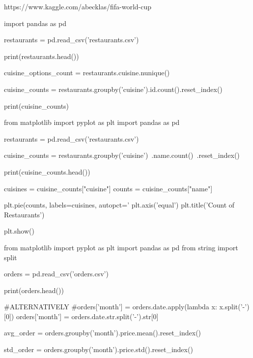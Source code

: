 \documentclass{journal}
\begin{document}
https://www.kaggle.com/abecklas/fifa-world-cup



import pandas as pd

restaurants = pd.read_csv('restaurants.csv')

print(restaurants.head())

cuisine_options_count = restaurants.cuisine.nunique()

cuisine_counts = restaurants.groupby('cuisine').id.count().reset_index()

print(cuisine_counts)












from matplotlib import pyplot as plt
import pandas as pd

restaurants = pd.read_csv('restaurants.csv')

cuisine_counts = restaurants.groupby('cuisine')\
                            .name.count()\
                            .reset_index()


print(cuisine_counts.head())

cuisines = cuisine_counts["cuisine"]
counts = cuisine_counts["name"]

plt.pie(counts, labels=cuisines, autopct='%
plt.axis('equal')
plt.title('Count of Restaurants')

plt.show()







from matplotlib import pyplot as plt
import pandas as pd
from string import split

orders = pd.read_csv('orders.csv')

print(orders.head())

#ALTERNATIVELY
#orders['month'] = orders.date.apply(lambda x: x.split('-')[0])
orders['month'] = orders.date.str.split('-').str[0]

avg_order = orders.groupby('month').price.mean().reset_index()

std_order = orders.groupby('month').price.std().reset_index()
\end{document}
